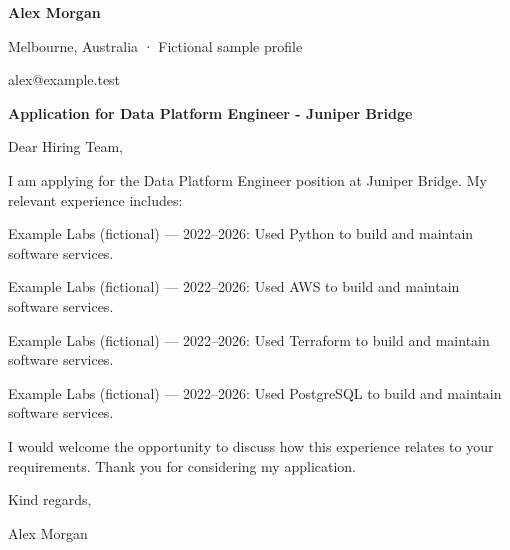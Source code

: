 \documentclass[10pt,a4paper]{article}
\begin{document}
{\LARGE\bfseries\color{navy} Alex Morgan}\par
Melbourne, Australia · Fictional sample profile\par
alex@example.test\par
{\large\bfseries\color{navy} Application for Data Platform Engineer - Juniper Bridge}\par
Dear Hiring Team,\par
I am applying for the Data Platform Engineer position at Juniper Bridge. My relevant experience includes:\par
Example Labs (fictional) — 2022–2026: Used Python to build and maintain software services.\par
Example Labs (fictional) — 2022–2026: Used AWS to build and maintain software services.\par
Example Labs (fictional) — 2022–2026: Used Terraform to build and maintain software services.\par
Example Labs (fictional) — 2022–2026: Used PostgreSQL to build and maintain software services.\par
I would welcome the opportunity to discuss how this experience relates to your requirements. Thank you for considering my application.\par
Kind regards,\par
Alex Morgan\par
\end{document}
